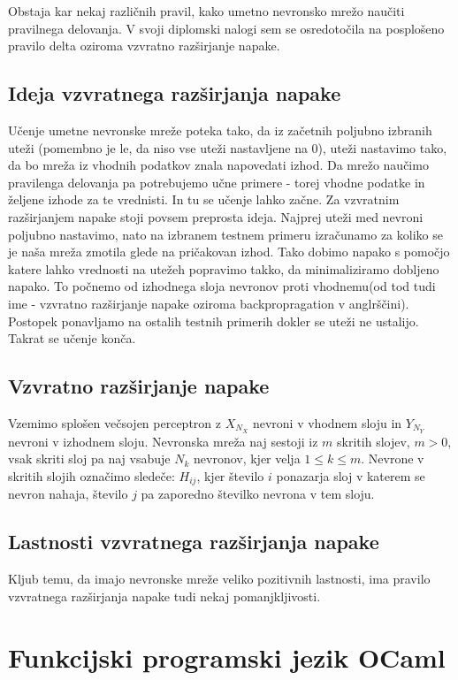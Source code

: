 \documentclass[mat1]{fmfdelo}
\begin{document}
Obstaja kar nekaj različnih pravil, kako umetno nevronsko mrežo naučiti pravilnega delovanja. V svoji diplomski nalogi sem se osredotočila na posplošeno pravilo delta oziroma vzvratno razširjanje napake. 

\subsection{Ideja vzvratnega razširjanja napake}
Učenje umetne nevronske mreže poteka tako, da iz začetnih poljubno izbranih uteži (pomembno je le, da niso vse uteži nastavljene na 0), uteži nastavimo tako, da bo mreža iz vhodnih podatkov znala napovedati izhod. Da mrežo naučimo pravilenga delovanja pa potrebujemo učne primere - torej vhodne podatke in željene izhode za te vrednisti. In tu se učenje lahko začne.
Za vzvratnim razširjanjem napake stoji povsem preprosta ideja. Najprej uteži med nevroni poljubno nastavimo, nato na izbranem testnem primeru izračunamo za koliko se je naša mreža zmotila glede na pričakovan izhod. Tako dobimo napako s pomočjo katere lahko  vrednosti na utežeh popravimo takko, da minimaliziramo dobljeno napako. To počnemo od izhodnega sloja nevronov proti vhodnemu(od tod tudi ime -  vzvratno razširjanje napake oziroma backpropragation v anglrščini). Postopek ponavljamo na ostalih testnih primerih dokler se uteži ne ustalijo. Takrat se učenje konča.

\subsection{Vzvratno razširjanje napake}
Vzemimo splošen večsojen perceptron z $X_{N_X}$ nevroni v vhodnem sloju in $Y_{N_Y}$ nevroni v izhodnem sloju. Nevronska mreža naj sestoji iz $m$ skritih slojev, $m>0$, vsak skriti sloj pa naj vsabuje $N_k$ nevronov, kjer velja $1\leq k \leq m$. Nevrone v skritih slojih označimo sledeče: $H_{ij}$, kjer število $i$ ponazarja sloj v katerem se nevron nahaja, število $j$ pa zaporedno številko nevrona v tem sloju. 

\subsection{Lastnosti vzvratnega razširjanja napake}
Kljub temu, da imajo nevronske mreže veliko pozitivnih lastnosti, ima pravilo vzvratnega razširjanja napake tudi nekaj pomanjkljivosti.



\section{Funkcijski programski jezik OCaml}
\end{document}
